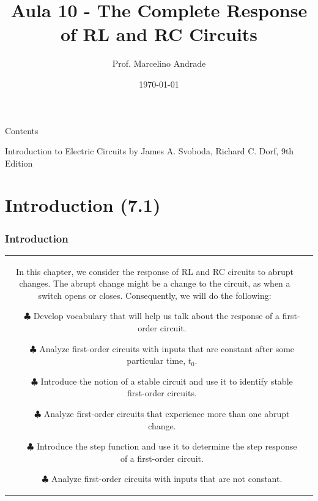 \documentclass[aspectratio=169]{beamer}
\title[\sc{Teoria de Circuitos Eletrônicos 1}]{\LARGE Aula 10 - The Complete Response of RL and RC Circuits}
\author[Prof. Marcelino Andrade]{Prof. Marcelino Andrade}
\institute{Faculdade UnB Gama} %
\date{\today}
\begin{document}
\justifying %
\pagebreak

\begin{frame}
  \titlepage
\end{frame}


\begin{frame}{Contents}

\tableofcontents
     		Introduction to Electric Circuits by James A. Svoboda, Richard C. Dorf, 9th Edition 
\end{frame}

\section{Introduction (7.1)}
\begin{frame}[fragile]
	\frametitle{Introduction}
		\begin{tabular}{cc}
			\begin{columns}
				\begin{column}{1\textwidth}  %
					In this chapter, we consider the response of RL and RC circuits to abrupt changes. The abrupt change
might be a change to the circuit, as when a switch opens or closes. Consequently, we will do the following:	
		
\small 			\begin{itemize}
						\item[$\clubsuit$]{Develop vocabulary that will help us talk about the response of a first-order circuit.}
						\item[$\clubsuit$]{Analyze first-order circuits with inputs that are constant after some particular time, $t_0$.}
						\item[$\clubsuit$]{Introduce the notion of a stable circuit and use it to identify stable first-order circuits.}	
						\item[$\clubsuit$]{Analyze first-order circuits that experience more than one abrupt change.}	
						\item[$\clubsuit$]{Introduce the step function and use it to determine the step response of a first-order circuit.}	
						\item[$\clubsuit$]{Analyze first-order circuits with inputs that are not constant.}	

					\end{itemize}
					
				\end{column}
			\end{columns}
		
	\end{tabular}
\end{frame}
\end{document}
